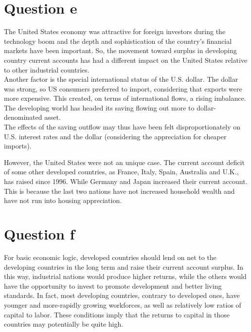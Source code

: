 \documentclass[	11pt, ]{fphw}
\begin{document}
\section*{Question e}
The United States economy was attractive for foreign investors  during the technology boom and the depth and sophistication of the country's financial markets have been important. So, the movement toward surplus in developing country current accounts has had a different impact on the United States relative to other industrial countries.\\
Another factor is the special international status of the U.S. dollar. The dollar was strong, so US consumers preferred to import, considering that exports were more expensive. This created, on terms of international flows, a rising imbalance. The developing world has headed its saving flowing out more to dollar-denominated asset.   \\
The effects of the saving outflow may thus have been felt disproportionately on U.S. interest rates and the dollar (considering the appreciation for cheaper imports).  \\

\par However, the United States were not an unique case. The current account deficit of some other developed countries, as France, Italy, Spain, Australia and U.K., has raised since 1996. While Germany and Japan increased their current account. 
This is because the last two nations have not increased household wealth and have not run into housing appreciation. 

\section*{Question f}
For basic economic logic, developed countries should lend on net to the developing countries in the long term and raise their current account surplus. In this way, industrial nations would produce higher returns, while the others would have the opportunity to invest to promote development and better living standards. In fact, most developing countries, contrary to developed ones, have younger and more-rapidly growing workforces, as well as relatively low ratios of capital to labor. These conditions imply that the returns to capital in those countries may potentially be quite high. 
\end{document}
